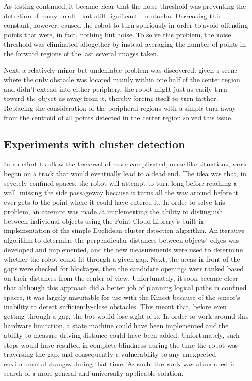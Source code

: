 \documentclass[12pt]{report}
\begin{document}
As testing continued, it became clear that the noise threshold was preventing the detection of many small---but still significant---obstacles.  Decreasing this constant, however, caused the robot to turn spuriously in order to avoid offending points that were, in fact, nothing but noise.  To solve this problem, the noise threshold was eliminated altogether by instead averaging the number of points in the forward regions of the last several images taken.

Next, a relatively minor but undeniable problem was discovered: given a scene where the only obstacle was located mainly within one half of the center region and didn't extend into either periphery, the robot might just as easily turn toward the object as away from it, thereby forcing itself to turn farther.  Replacing the consideration of the peripheral regions with a simple turn away from the centroid of all points detected in the center region solved this issue.

\subsection[Cluster detection]{Experiments with cluster detection}
In an effort to allow the traversal of more complicated, maze-like situations, work began on a track that would eventually lead to a dead end.  The idea was that, in severely confined spaces, the robot will attempt to turn long before reaching a wall, missing the side passageway because it turns all the way around before it ever gets to the point where it could have entered it.  In order to solve this problem, an attempt was made at implementing the ability to distinguish between individual objects using the Point Cloud Library's built-in implementation of the simple Euclidean cluster detection algorithm.  An iterative algorithm to determine the perpendicular distances between objects' edges was developed and implemented, and the new measurements were used to determine whether the robot could fit through a given gap.  Next, the areas in front of the gaps were checked for blockages, then the candidate openings were ranked based on their distances from the center of view.  Unfortunately, it soon became clear that although this approach did a better job of planning logical paths in confined spaces, it was largely unsuitable for use with the Kinect because of the sensor's inability to detect sufficiently-close obstacles.  This meant that, before even getting through a gap, the bot would lose sight of it.  In order to work around this hardware limitation, a state machine could have been implemented and the ability to measure driving distance could have been added.  Unfortunately, such steps would have resulted in complete blindness during the time the robot was traversing the gap, and consequently a vulnerability to any unexpected environmental changes during that time.  As such, the work was abandoned in search of a more general and universally-applicable solution.
\end{document}
